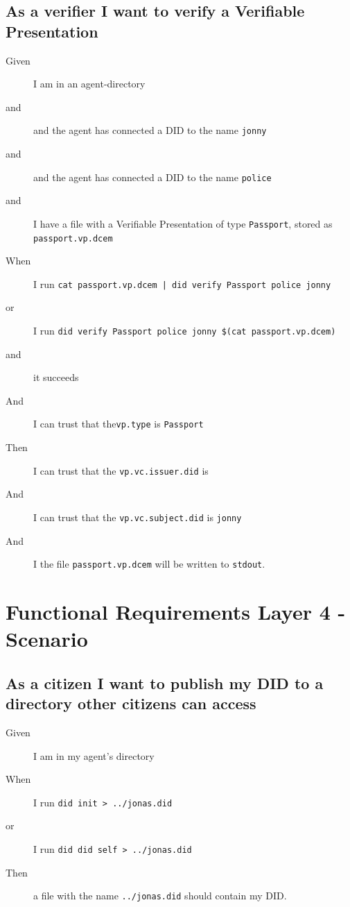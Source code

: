 \subsection{As a verifier I want to verify a Verifiable Presentation}
\begin{description}\begin{description}
    \item[Given] I am in an agent-directory
    \item[and] and the agent has connected a DID to the name \texttt{jonny}
    \item[and] and the agent has connected a DID to the name \texttt{police}
    \item[and] I have a file with a Verifiable Presentation of type \texttt{Passport}, stored as \texttt{passport.vp.dcem}
    \item[When] I run \texttt{cat passport.vp.dcem | did verify Passport police jonny}
    \item[or] I run \texttt{did verify Passport police jonny \$(cat passport.vp.dcem)}
    \item[and] it succeeds
    \item[And] I can trust that the\texttt{vp.type} is \texttt{Passport}
    \item[Then] I can trust that the \texttt{vp.vc.issuer.did} is 
    \item[And] I can trust that the \texttt{vp.vc.subject.did} is \texttt{jonny}
    \item[And] I the file \texttt{passport.vp.dcem} will be written to \texttt{stdout}.
\end{description}\end{description}



\newpage



\section{Functional Requirements Layer 4 - Scenario}



\subsection{As a citizen I want to publish my DID to a directory other citizens can access}
\begin{description}\begin{description}
    \item[Given] I am in my agent's directory
    \item[When] I run \texttt{did init > ../jonas.did}
    \item[or] I run \texttt{did did self > ../jonas.did}
    \item[Then] a file with the name \texttt{../jonas.did} should contain my DID.
\end{description}\end{description}



